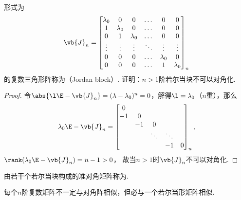 \begin{example}
\def\J{\vb{J}_n}
形式为\[
	\J = \begin{bmatrix}
		\lambda_0 & 0 & 0 & \dots & 0 & 0 \\
		1 & \lambda_0 & 0 & \dots & 0 & 0 \\
		0 & 1 & \lambda_0 & \dots & 0 & 0 \\
		\vdots & \vdots & \vdots & \ddots & \vdots & \vdots \\
		0 & 0 & 0 & \dots & \lambda_0 & 0 \\
		0 & 0 & 0 & \dots & 1 & \lambda_0
	\end{bmatrix}_n
\]的复数三角形阵称为（Jordan block）.
证明：\(n>1\)阶若尔当块不可以对角化.
\begin{proof}
令\(\abs{\l\E-\J}=(\lambda-\lambda_0)^n=0\)，解得\(\l=\lambda_0\)（\(n\)重），那么\[
	\lambda_0\E-\J = \begin{bmatrix}
		0 \\
		-1 & 0 \\
		& -1 & 0 \\
		& & \ddots & \ddots \\
		& & & -1 & 0
	\end{bmatrix}_n,
\]
\(\rank(\lambda_0\E-\J)=n-1 > 0\)，
故当\(n>1\)时\(\J\)不可以对角化.
\end{proof}
\end{example}

\begin{definition}
由若干个若尔当块构成的准对角矩阵称为.
\end{definition}

\begin{theorem}
每个\(n\)阶复数矩阵不一定与对角阵相似，但必与一个若尔当形矩阵相似.
\end{theorem}
